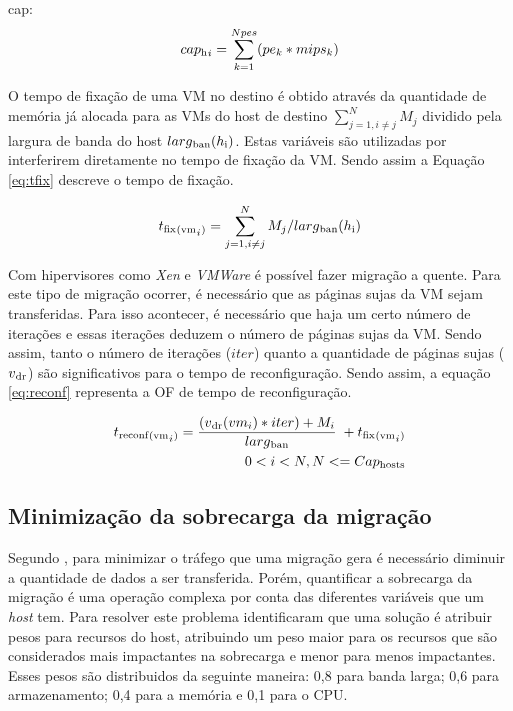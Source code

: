 cap:
\begin{equation}
\begin{split}
cap\textsubscript{h}_i = \sum_{k=1}^{Npes}(pe_k * mips_k)
\end{split}
\label{eq:cap}
\end{equation}

O tempo de fixação de uma VM no destino é obtido através da quantidade de memória 
já alocada para as VMs do host de destino $\sum_{j=1,i \neq j}^{N} M_j$ dividido pela
largura de banda do host $larg\textsubscript{ban}({h}\textsubscript{i})$. Estas variáveis 
são utilizadas por interferirem diretamente no tempo de fixação da VM.
Sendo assim a Equação \ref{eq:tfix} descreve o tempo de fixação.

\begin{equation}
t\textsubscript{fix}\textsubscript{(vm}_i\textsubscript{)} = \sum_{j=1,i \neq j}^{N} M_j/larg\textsubscript{ban}({h}\textsubscript{i})
\label{eq:tfix} 
\end{equation}

Com hipervisores como \textit{Xen} e \textit{VMWare} é possível fazer migração a quente.
Para este tipo de migração ocorrer, é necessário que as páginas sujas da VM sejam transferidas.
Para isso acontecer, é necessário que haja um certo número de iterações e essas iterações deduzem
o número de páginas sujas da VM. Sendo assim, tanto o número de iterações ($ iter $)
quanto a quantidade de páginas sujas ($ v\textsubscript{dr} $) são significativos para 
o tempo de reconfiguração. Sendo assim, a equação \ref{eq:reconf} representa a OF 
de tempo de reconfiguração.

\begin{equation}
\begin{split}
t\textsubscript{reconf}\textsubscript{(vm}_i\textsubscript{)} = \dfrac{ (v\textsubscript{dr}(vm_i) * iter) + M_i}{larg\textsubscript{ban}} \; + t\textsubscript{fix}\textsubscript{(vm}_i\textsubscript{)} \\
0<i<N, N <= Cap\textsubscript{hosts}
\end{split}
\label{eq:reconf}
\end{equation}

\subsection{Minimização da sobrecarga da migração}

Segundo \cite{anand}, para minimizar o tráfego que uma migração gera 
é necessário diminuir a quantidade de dados a ser transferida. Porém,
quantificar a sobrecarga da migração é uma operação complexa por conta 
das diferentes variáveis que um \textit{host} tem. Para resolver este problema 
\cite{anand} identificaram que uma solução é atribuir pesos para recursos do 
host, atribuindo um peso maior para os recursos que são considerados mais impactantes
na sobrecarga e menor para menos impactantes. Esses pesos são distribuidos 
da seguinte maneira: 0,8 para banda larga; 0,6 para armazenamento; 0,4 para a memória 
e 0,1 para o CPU.

